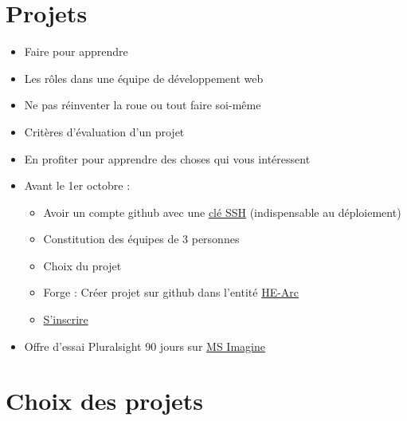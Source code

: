 \hypertarget{projets}{%
\section{Projets}\label{projets}}

\begin{itemize}
\tightlist
\item
  Faire pour apprendre
\item
  Les rôles dans une équipe de développement web
\item
  Ne pas réinventer la roue ou tout faire soi-même
\item
  Critères d'évaluation d'un projet
\item
  En profiter pour apprendre des choses qui vous intéressent
\item
  Avant le 1er octobre :

  \begin{itemize}
  \tightlist
  \item
    Avoir un compte github avec une
    \href{https://github.com/settings/keys}{clé SSH} (indispensable au
    déploiement)
  \item
    Constitution des équipes de 3 personnes
  \item
    Choix du projet
  \item
    Forge : Créer projet sur github dans l'entité
    \href{https://github.com/HE-Arc/}{HE-Arc}
  \item
    \href{https://github.com/HE-Arc/slides-devweb/wiki/Projets-2018-2019}{S'inscrire}
  \end{itemize}
\item
  Offre d'essai Pluralsight 90 jours sur
  \href{https://imagine.microsoft.com/fr-fr/Catalog/Product/21}{MS
  Imagine}
\end{itemize}

\hypertarget{choix-des-projets}{%
\section{Choix des projets}\label{choix-des-projets}}

